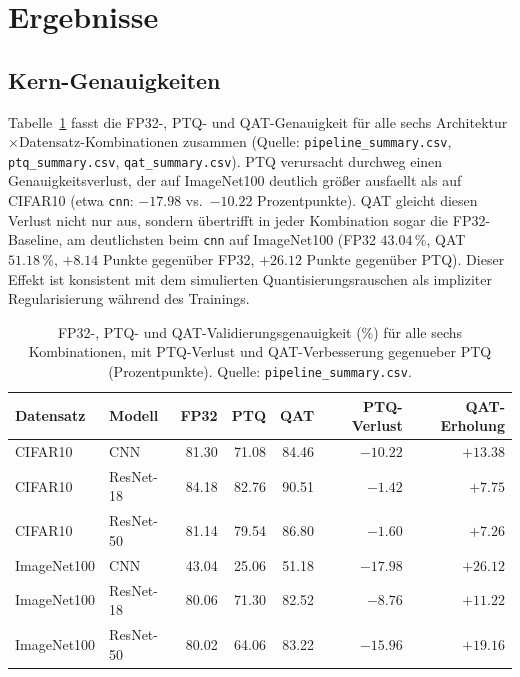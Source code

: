\section{Ergebnisse}
\label{sec:results}

\subsection{Kern-Genauigkeiten}
\label{sec:accuracies}

Tabelle~\ref{tab:accuracy} fasst die FP32-, PTQ- und QAT-Genauigkeit für alle sechs Architektur$\times$Datensatz-Kombinationen zusammen (Quelle: \texttt{pipeline\_summary.csv}, \texttt{ptq\_summary.csv}, \texttt{qat\_summary.csv}). PTQ verursacht durchweg einen Genauigkeitsverlust, der auf ImageNet100 deutlich größer ausfaellt als auf CIFAR10 (etwa \texttt{cnn}: $-17.98$ vs.\ $-10.22$ Prozentpunkte). QAT gleicht diesen Verlust nicht nur aus, sondern übertrifft in jeder Kombination sogar die FP32-Baseline, am deutlichsten beim \texttt{cnn} auf ImageNet100 (FP32 $43.04\,\%$, QAT $51.18\,\%$, $+8.14$ Punkte gegenüber FP32, $+26.12$ Punkte gegenüber PTQ). Dieser Effekt ist konsistent mit dem simulierten Quantisierungsrauschen als impliziter Regularisierung während des Trainings.

\begin{table}[t]
\centering
\small
\caption{FP32-, PTQ- und QAT-Validierungsgenauigkeit (\%) für alle sechs Kombinationen, mit PTQ-Verlust und QAT-Verbesserung gegenueber PTQ (Prozentpunkte). Quelle: \texttt{pipeline\_summary.csv}.}
\label{tab:accuracy}
\begin{tabular}{llrrrrr}
\toprule
Datensatz & Modell & FP32 & PTQ & QAT & PTQ-Verlust & QAT-Erholung \\
\midrule
CIFAR10 & CNN & 81.30 & 71.08 & 84.46 & $-10.22$ & $+13.38$ \\
CIFAR10 & ResNet-18 & 84.18 & 82.76 & 90.51 & $-1.42$ & $+7.75$ \\
CIFAR10 & ResNet-50 & 81.14 & 79.54 & 86.80 & $-1.60$ & $+7.26$ \\
ImageNet100 & CNN & 43.04 & 25.06 & 51.18 & $-17.98$ & $+26.12$ \\
ImageNet100 & ResNet-18 & 80.06 & 71.30 & 82.52 & $-8.76$ & $+11.22$ \\
ImageNet100 & ResNet-50 & 80.02 & 64.06 & 83.22 & $-15.96$ & $+19.16$ \\
\bottomrule
\end{tabular}
\end{table}

